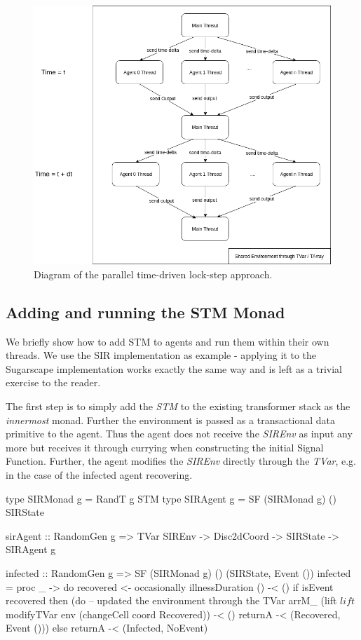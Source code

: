 \begin{figure}
	\centering
	\includegraphics[width=1.0\textwidth, angle=0]{./fig/concurrentabs/stm_abs.png}
	\caption{Diagram of the parallel time-driven lock-step approach.}
	\label{fig:stm_abs_structure}
\end{figure}

\subsection{Adding and running the STM Monad}
We briefly show how to add STM to agents and run them within their own threads. We use the SIR implementation as example - applying it to the Sugarscape implementation works exactly the same way and is left as a trivial exercise to the reader.

The first step is to simply add the \textit{STM} to the existing transformer stack as the \textit{innermost} monad. Further the environment is passed as a transactional data primitive to the agent. Thus the agent does not receive the \textit{SIREnv} as input any more but receives it through currying when constructing the initial Signal Function. Further, the agent modifies the \textit{SIREnv} directly through the \textit{TVar}, e.g. in the case of the infected agent recovering.

\begin{HaskellCode}
type SIRMonad g = RandT g STM
type SIRAgent g = SF (SIRMonad g) () SIRState

sirAgent :: RandomGen g => TVar SIREnv -> Disc2dCoord -> SIRState -> SIRAgent g

infected :: RandomGen g => SF (SIRMonad g) () (SIRState, Event ())
infected = proc _ -> do
  recovered <- occasionally illnessDuration () -< ()
  if isEvent recovered
    then (do
    	  -- updated the environment through the TVar
      arrM_ (lift $ lift $ modifyTVar env (changeCell coord Recovered)) -< ()
      returnA -< (Recovered, Event ()))
    else returnA -< (Infected, NoEvent)
\end{HaskellCode}

